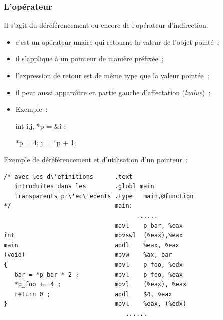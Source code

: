 \begin{frame}[fragile]
  \frametitle{L'op\'erateur {\tt *}} Il s'agit du
  d\'er\'ef\'erencement ou encore de l'op\'erateur d'indirection.
\begin{itemize}
\item c'est un op\'erateur unaire {\tt *} qui retourne la valeur de
  l'objet point\'e~;
\item il s'applique \`a un pointeur de mani\`ere pr\'efix\'ee~;
\item l'expression de retour est de m\^eme type que la valeur
  point\'ee~;
  \item il peut aussi appara\^\i{}tre en partie gauche d'affectation ({\it lvalue})~;
  \item Exemple~: \par
\begin{texttt}
  int i,j, *p = \&i ; \par
 *p = 4; j = *p + 1; 
\end{texttt}
\end{itemize}
\end{frame}
\begin{frame}[fragile]
Exemple de d\'er\'ef\'erencement et d'utilisation d'un pointeur~:
\begin{verbatim}
/* avec les d\'efinitions      .text                     
   introduites dans les        .globl main                      
   transparents pr\'ec\'edents .type   main,@function   
*/                             main:                            
                                     ......                   
                               movl    p_bar, %eax      
int                            movswl  (%eax),%eax      
main                           addl    %eax, %eax       
(void)                         movw    %ax, bar         
{                              movl    p_foo, %edx      
   bar = *p_bar * 2 ;          movl    p_foo, %eax      
   *p_foo += 4 ;               movl    (%eax), %eax     
   return 0 ;                  addl    $4, %eax         
}                              movl    %eax, (%edx)     
                                  ......                   
\end{verbatim}
\end{frame}
